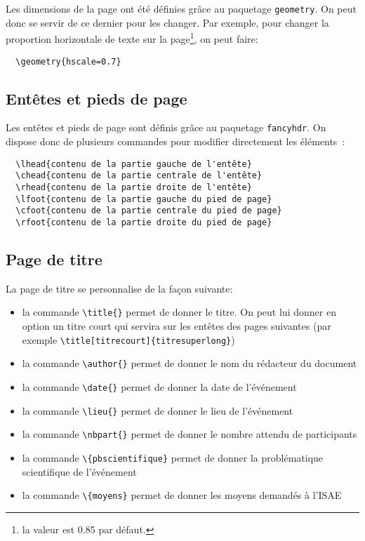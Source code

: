 \documentclass[fr]{supaero-orga}
\begin{document}
Les dimensions de la page ont été définies grâce au paquetage
\texttt{geometry}. On peut donc se servir de ce dernier pour les
changer. Par exemple, pour changer la proportion horizontale de texte
sur la page\footnote{la valeur est 0.85 par défaut.}, on peut faire:

\begin{verbatim}
  \geometry{hscale=0.7}
\end{verbatim}

\subsection{Entêtes et pieds de page}
\label{sec:entetes-et-pieds}

Les entêtes et pieds de page sont définis grâce au paquetage
\texttt{fancyhdr}. On dispose donc de plusieurs commandes pour
modifier directement les éléments~:

\begin{verbatim}
  \lhead{contenu de la partie gauche de l'entête}
  \chead{contenu de la partie centrale de l'entête}
  \rhead{contenu de la partie droite de l'entête}
  \lfoot{contenu de la partie gauche du pied de page}
  \cfoot{contenu de la partie centrale du pied de page}
  \rfoot{contenu de la partie droite du pied de page}
\end{verbatim}

\subsection{Page de titre}
\label{sec:page-de-titre}

La page de titre se personnalise de la façon suivante:

\begin{itemize}
\item la commande \verb!\title{}! permet de donner le titre. On peut
  lui donner en option un titre court qui servira sur les entêtes des
  pages suivantes (par exemple
  \verb!\title[titrecourt]{titresuperlong}!)
\item la commande \verb!\author{}! permet de donner le nom du
  rédacteur du document
\item la commande \verb!\date{}! permet de donner la date de
  l'événement
\item la commande \verb!\lieu{}! permet de donner le lieu de
l'événement
\item la commande \verb!\nbpart{}! permet de donner le nombre attendu
  de participants
\item la commande \verb!\{pbscientifique}! permet de donner la
problématique scientifique de l'événement
\item la commande \verb!\{moyens}! permet de donner les moyens
demandés à l'ISAE
\end{itemize}
\end{document}
